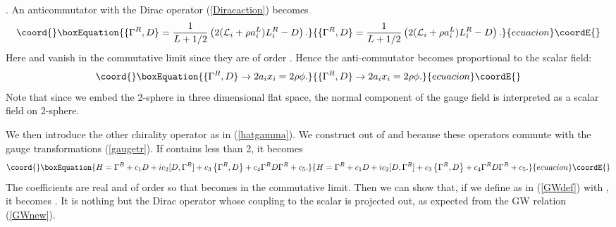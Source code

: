 \documentclass[a4paper,prl,showpacs,twocolumn]{revtex4}
\begin{document}
\coordHE{}.
An anticommutator with the Dirac operator (\ref{Diracaction}) 
becomes
\begin{equation}\coord{}\boxEquation{
\{\Gamma^R,D \}= \frac{1}{L+1/2} \left(
2({\cal L}_i+\rho a_i^L)L_i^R - D
\right). \label{gammaDac}
}{
\{\Gamma^R,D \}= \frac{1}{L+1/2} \left(
2({\cal L}_i+\rho a_i^L)L_i^R - D
\right). }{ecuacion}\coordE{}\end{equation}
Here \coordHE{} and \coordHE{} vanish in the 
commutative 
limit since they are of order \coordHE{}.
Hence the anti-commutator becomes proportional to the 
scalar field:
\begin{equation}\coord{}\boxEquation{
\{\Gamma^R,D \} \rightarrow 2  a_i x_i = 2 \rho \phi.
}{
\{\Gamma^R,D \} \rightarrow 2  a_i x_i = 2 \rho \phi.
}{ecuacion}\coordE{}\end{equation}
Note that since we embed the 2-sphere in three dimensional
flat space, the normal component of the gauge field \coordHE{}
is interpreted as a scalar field on 2-sphere.
\par
We then introduce
the other chirality  operator \myHighlight{$\hat{\Gamma}$}\coordHE{} as in (\ref{hatgamma}).
We construct \coordHE{} out of \coordHE{} and \coordHE{}
because these operators commute with the gauge transformations
(\ref{gaugetr}).
If \coordHE{} contains \coordHE{} less than 2, it becomes
\begin{equation}\coord{}\boxEquation{
H= \Gamma^R + c_1 D+ ic_2 [D, \Gamma^R]
+ c_3 \left\{\Gamma^R,D \right\} +c_4 \Gamma^R D  \Gamma^R +c_5. 
}{
H= \Gamma^R + c_1 D+ ic_2 [D, \Gamma^R]
+ c_3 \left\{\Gamma^R,D \right\} +c_4 \Gamma^R D  \Gamma^R +c_5. 
}{ecuacion}\coordE{}\end{equation}
The coefficients \coordHE{} are real and of order \coordHE{} 
so that \myHighlight{$\hat\Gamma$}\coordHE{} becomes \myHighlight{$\gamma$}\coordHE{} in the commutative limit.
Then we can show that, if we define \coordHE{} 
as in (\ref{GWdef}) with
\coordHE{}, 
it becomes
\coordHE{}.
It is nothing but the Dirac operator whose
coupling to the scalar is projected out,
as expected from the GW relation (\ref{GWnew}).
\par
\end{document}
